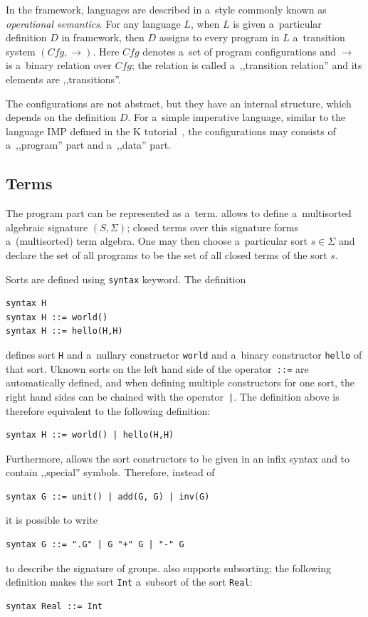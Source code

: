 \documentclass{fithesis3}
\newcommand{\var}[1]{\mathit{#1}\xspace}
\begin{document}
In the \K framework, languages are described in a~style commonly known as \textit{operational semantics}. For any language $\var{L}$, when $\var{L}$ is given a~particular definition $\var{D}$ in \K framework, then $\var{D}$ assigns to every program in $\var{L}$ a~transition system $( \var{Cfg}, \rightarrow )$. Here $\var{Cfg}$ denotes a~set of program configurations and $\rightarrow$ is a~binary relation over $\var{Cfg}$; the relation is called a~,,transition relation'' and its elements are ,,transitions''. %


The configurations are not abstract, but they have an internal structure, which depends on the definition $\var{D}$. For a~simple imperative language, similar to the language IMP defined in the K tutorial~\cite{k-tutorial}, the configurations may consists of a~,,program'' part and a~,,data'' part.

\subsection{Terms}

The program part can be represented as a~term. \K allows to define a~multisorted algebraic signature $(S, \Sigma)$; closed terms over this signature forms a~(multisorted) term algebra. One may then choose a~particular sort $s \in \Sigma$ and declare the set of all programs to be the set of all closed terms of the sort $s$.

Sorts are defined using \texttt{syntax} keyword. The definition
\begin{lstlisting}
syntax H
syntax H ::= world()
syntax H ::= hello(H,H)
\end{lstlisting}
defines sort \texttt{H} and a~nullary constructor \texttt{world} and a~binary constructor \texttt{hello} of that sort. Uknown sorts on the left hand side of the operator~\texttt{::=} are automatically defined, and when defining multiple constructors for one sort, the right hand sides can be chained with the operator~\texttt{|}. The definition above is therefore equivalent to the following definition:
\begin{lstlisting}
syntax H ::= world() | hello(H,H)
\end{lstlisting}
Furthermore, \K allows the sort constructors to be given in an infix syntax and to contain ,,special'' symbols. Therefore, instead of
\begin{lstlisting}
syntax G ::= unit() | add(G, G) | inv(G)
\end{lstlisting}
it is possible to write
\begin{lstlisting}
syntax G ::= ".G" | G "+" G | "-" G
\end{lstlisting}
to describe the signature of groups. \K also supports subsorting; the following definition makes the sort \texttt{Int} a~subsort of the sort \texttt{Real}:
\begin{lstlisting}
syntax Real ::= Int
\end{lstlisting}
\end{document}
